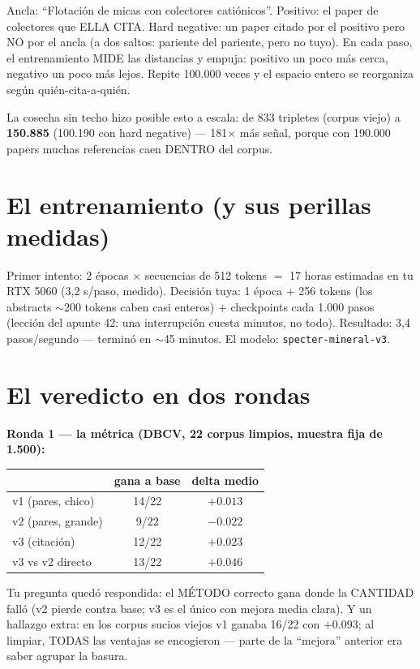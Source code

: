 \documentclass[11pt,a4paper]{article}
\begin{document}
Ancla: ``Flotación de micas con colectores catiónicos''. Positivo: el paper de colectores
que ELLA CITA. Hard negative: un paper citado por el positivo pero NO por el ancla (a dos
saltos: pariente del pariente, pero no tuyo). En cada paso, el entrenamiento MIDE las
distancias y empuja: positivo un poco más cerca, negativo un poco más lejos. Repite
100.000 veces y el espacio entero se reorganiza según quién-cita-a-quién.

La cosecha sin techo hizo posible esto a escala: de 833 tripletes (corpus viejo) a
\textbf{150.885} (100.190 con hard negative) --- 181$\times$ más señal, porque con
190.000 papers muchas referencias caen DENTRO del corpus.

\section{El entrenamiento (y sus perillas medidas)}

Primer intento: 2 épocas $\times$ secuencias de 512 tokens $=$ 17 horas estimadas en tu
RTX 5060 (3,2 s/paso, medido). Decisión tuya: 1 época + 256 tokens (los abstracts
$\sim$200 tokens caben casi enteros) + checkpoints cada 1.000 pasos (lección del apunte
42: una interrupción cuesta minutos, no todo). Resultado: 3,4 pasos/segundo --- terminó
en $\sim$45 minutos. El modelo: \texttt{specter-mineral-v3}.

\section{El veredicto en dos rondas}

\textbf{Ronda 1 --- la métrica (DBCV, 22 corpus limpios, muestra fija de 1.500):}

\begin{center}
\begin{tabular}{lcc}
 & gana a base & delta medio \\
\hline
v1 (pares, chico)   & 14/22 & $+0.013$ \\
v2 (pares, grande)  & 9/22  & $-0.022$ \\
v3 (citación)       & 12/22 & $\mathbf{+0.023}$ \\
v3 vs v2 directo    & 13/22 & $+0.046$ \\
\end{tabular}
\end{center}

Tu pregunta quedó respondida: el MÉTODO correcto gana donde la CANTIDAD falló (v2 pierde
contra base; v3 es el único con mejora media clara). Y un hallazgo extra: en los corpus
sucios viejos v1 ganaba 16/22 con $+0.093$; al limpiar, TODAS las ventajas se encogieron
--- parte de la ``mejora'' anterior era saber agrupar la basura.
\end{document}

